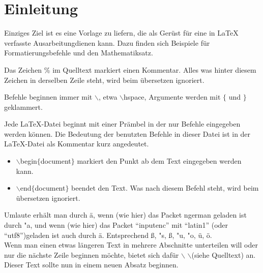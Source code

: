 \section{Einleitung}

Einziges Ziel ist es eine Vorlage zu liefern, die als Gerüst für eine in LaTeX verfasste Ausarbeitung\footnotemark dienen kann. Dazu finden sich Beispiele für Formatierungsbefehle und den Mathematiksatz. 



Das Zeichen \% %
im Quelltext markiert einen Kommentar. Alles was hinter diesem Zeichen in derselben Zeile steht, wird beim \"ubersetzen ignoriert.

Befehle beginnen immer mit $\backslash$, etwa $\backslash$hspace,
Argumente werden mit $\{$ und $\}$ geklammert.

Jede LaTeX-Datei beginnt mit einer Prämbel in der nur Befehle
eingegeben werden können. Die Bedeutung der benutzten Befehle in
dieser Datei ist in der LaTeX-Datei als Kommentar kurz angedeutet.

\begin{itemize}
\item $\backslash$begin$\{$document$\}$ markiert den Punkt ab dem Text
eingegeben werden kann.
\item $\backslash$end$\{$document$\}$ beendet den Text. Was nach diesem Befehl steht, wird beim übersetzen ignoriert.
\end{itemize}

Umlaute erhält man durch \"a, wenn (wie hier) das Packet ngerman
geladen ist durch "a, und wenn (wie hier) das Packet ``inputenc'' mit ``latin1'' (oder ``utf8'')geladen ist auch durch ä. Entsprechend \ss, "s, ß, "u, "o, ü, ö.\\


Wenn man einen etwas längeren Text in mehrere Abschnitte unterteilen will oder nur die nächste Zeile beginnen möchte, bietet sich dafür $\backslash$ $\backslash$(siehe Quelltext) an.\\

Dieser Text sollte nun in einem neuen Absatz beginnen.





